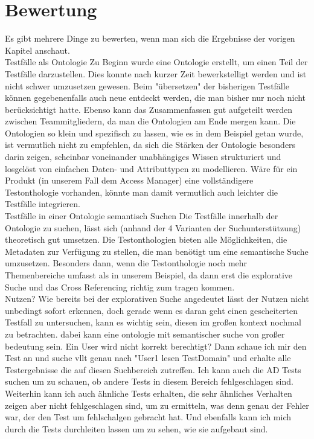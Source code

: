 \section{Bewertung}
Es gibt mehrere Dinge zu bewerten, wenn man sich die Ergebnisse der vorigen Kapitel anschaut. \\

Testfälle als Ontologie\newline
Zu Beginn wurde eine Ontologie erstellt, um einen Teil der Testfälle darzustellen. Dies konnte nach kurzer Zeit bewerkstelligt werden und ist nicht schwer umzusetzen gewesen. Beim "übersetzen" der bisherigen Testfälle können gegebenenfalls auch neue entdeckt werden, die man bisher nur noch nicht berücksichtigt hatte. Ebenso kann das Zusammenfassen gut aufgeteilt werden zwischen Teammitgliedern, da man die Ontologien am Ende mergen kann. Die Ontologien so klein und spezifisch zu lassen, wie es in dem Beispiel getan wurde, ist vermutlich nicht zu empfehlen, da sich die Stärken der Ontologie besonders darin zeigen, scheinbar voneinander unabhängiges Wissen strukturiert und losgelöst von einfachen Daten- und Attributtypen zu modellieren. Wäre für ein Produkt (in unserem Fall dem Access Manager) eine vollständigere Testonthologie vorhanden, könnte man damit vermutlich auch leichter die Testfälle integrieren.\\

Testfälle in einer Ontologie semantisch Suchen\newline
Die Testfälle innerhalb der Ontologie zu suchen, lässt sich (anhand der 4 Varianten der Suchunterstützung) theoretisch gut umsetzen. Die Testonthologien bieten alle Möglichkeiten, die Metadaten zur Verfügung zu stellen, die man benötigt um eine semantische Suche umzusetzen. Besonders dann, wenn die Testonthologie noch mehr Themenbereiche umfasst als in unserem Beispiel, da dann erst die explorative Suche und das Cross Referencing richtig zum tragen kommen.\\

Nutzen?\newline
Wie bereits bei der explorativen Suche angedeutet lässt der Nutzen nicht unbedingt sofort erkennen, doch gerade wenn es daran geht einen gescheiterten Testfall zu untersuchen, kann es wichtig sein, diesen im großen kontext nochmal zu betrachten. dabei kann eine ontologie mit semantischer suche von großer bedeutung sein. Ein User wird nicht korrekt berechtigt? Dann schaue ich mir den Test an und suche vllt genau nach "User1 lesen TestDomain" und erhalte alle Testergebnisse die auf diesen Suchbereich zutreffen. Ich kann auch die AD Tests suchen um zu schauen, ob andere Tests in diesem Bereich fehlgeschlagen sind. Weiterhin kann ich auch ähnliche Tests erhalten, die sehr ähnliches Verhalten zeigen aber nicht fehlgeschlagen sind, um zu ermitteln, was denn genau der Fehler war, der den Test um fehlschalgen gebracht hat. Und ebenfalls kann ich mich durch die Tests durchleiten lassen um zu sehen, wie sie aufgebaut sind. 
